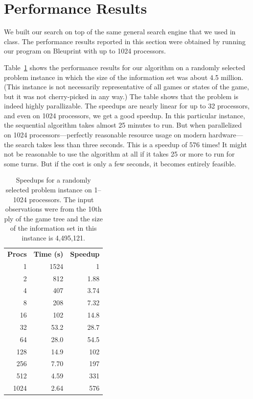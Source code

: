 \documentclass[11pt]{article}
\begin{document}
\section{Performance Results}
We built our search on top of the same general search engine that we used in class.  The performance results reported in
this section were obtained by running our program on Bleuprint with up to 1024 processors.

Table~\ref{speedups} shows the performance results for our algorithm on a randomly selected problem instance in which
the size of the information set was about 4.5 million.  (This instance is not necessarily representative of all games or
states of the game, but it was not cherry-picked in any way.)  The table shows that the problem is indeed highly
parallizable.  The speedups are nearly linear for up  to 32 processors, and even on 1024 processors, we get a good
speedup.  In this particular instance, the sequential algorithm takes almost 25 minutes to run.  But when parallelized
on 1024 processors---perfectly reasonable resource usage on modern hardware---the search takes less than three seconds.
This is a speedup of 576 times!  It might not be reasonable to use the algorithm at all if it takes 25 or more to run
for some turns.  But if the cost is only a few seconds, it becomes entirely feasible.

\begin{table}
\centering
\begin{tabular}{rrr}
{\bf Procs}	&	{\bf Time (s)} 	&	{\bf Speedup}\\
1	&	1524	&	1\\
2	&	812	&	1.88\\
4	&	407	&	3.74\\
8	&	208	&	7.32\\
16	&	102	&	14.8\\
32	&	53.2	&	28.7\\
64	&	28.0	&	54.5\\
128	&	14.9	&	102\\
256	&	7.70	&	197\\
512	&	4.59	&	331\\
1024	&	2.64	&	576\\
\end{tabular}
\caption{Speedups for a randomly selected problem instance on 1--1024 processors.  The input observations were from the
10th ply of the game tree and the size of the information set in this instance is 4,495,121.}
\label{speedups}
\end{table}
\end{document}

